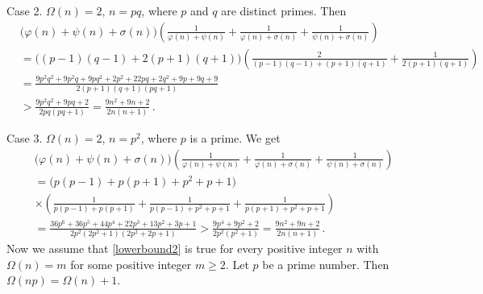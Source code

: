 \documentclass[12pt]{article}
\begin{document}
Case 2. \; $\Omega(n)=2$, $n=pq$, where $p$ and $q$ are distinct primes. Then
\begin{align*}
&\big(\varphi(n)+\psi(n)+\sigma(n)\big)\left(\frac{1}{\varphi(n)+\psi(n)}+\frac{1}{\varphi(n)+\sigma(n)}+\frac{1}{\psi(n)+\sigma(n)}\right)\\
&=\big((p-1)(q-1)+2(p+1)(q+1)\big)\left(\frac{2}{(p-1)(q-1)+(p+1)(q+1)}+\frac{1}{2(p+1)(q+1)}\right)\\   
&=\frac{9p^2q^2+9p^2q+9pq^2+2p^2+22pq+2q^2+9p+9q+9}{2(p+1)(q+1)(pq+1)}\\
&>\frac{9p^2q^2+9pq+2}{2pq(pq+1)}=\frac{9n^2+9n+2}{2n(n+1)}\,.
\end{align*}

Case 3. \; $\Omega(n)=2$, $n=p^2$, where $p$ is a prime. We get
\begin{align*}
&\big(\varphi(n)+\psi(n)+\sigma(n)\big)\left(\frac{1}{\varphi(n)+\psi(n)}+\frac{1}{\varphi(n)+\sigma(n)}+\frac{1}{\psi(n)+\sigma(n)}\right)\\
&=\big(p(p-1)+p(p+1)+p^2+p+1\big)\\
&\times\left(\frac{1}{p(p-1)+p(p+1)}+\frac{1}{p(p-1)+p^2+p+1}+\frac{1}{p(p+1)+p^2+p+1}\right)\\    
&=\frac{36p^6+36p^5+44p^4+22p^3+13p^2+3p+1}{2p^2(2p^2+1) (2p^2 + 2p + 1)}>\frac{9p^4+9p^2+2}{2p^2(p^2+1)}=\frac{9n^2+9n+2}{2n(n+1)}\,.
\end{align*}
Now we assume that \eqref{lowerbound2} is true for every positive integer $n$ with $\Omega(n)=m$ for some positive integer $m\geq2$.
Let $p$ be a prime number. Then $\Omega(np)=\Omega(n)+1$.
\end{document}
